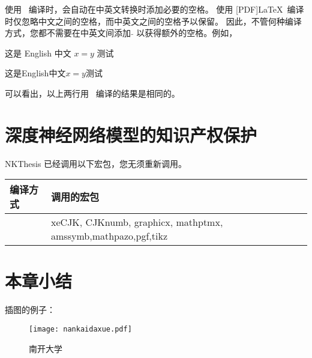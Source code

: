 使用 \XeLaTeX\ 编译时，会自动在中英文转换时添加必要的空格。 使用 [PDF]\LaTeX\
编译时仅忽略中文之间的空格，而中英文之间的空格予以保留。
因此，不管何种编译方式，您都不需要在中英文间添加 $\tilde{}$ 以获得额外的空格。例如，

这是 English 中文 $x=y$ 测试

这是English中文$x=y$测试

可以看出，以上两行用 \XeLaTeX\ 编译的结果是相同的。


\section{深度神经网络模型的知识产权保护}

NKThesis 已经调用以下宏包，您无须重新调用。

\begin{center}
\begin{tabular}{l|l}
\hline
编译方式 & 调用的宏包\\ \hline
\XeLaTeX & xeCJK, CJKnumb, graphicx, mathptmx, amssymb,mathpazo,pgf,tikz \\ \hline
\end{tabular}
\end{center}


\section{本章小结}
\label{sec:relatedwork:table}

插图的例子：

\begin{figure}
  \centering
  \texttt{[image: nankaidaxue.pdf]}  
  \caption{\label{fig:nku}南开大学}
\end{figure}

